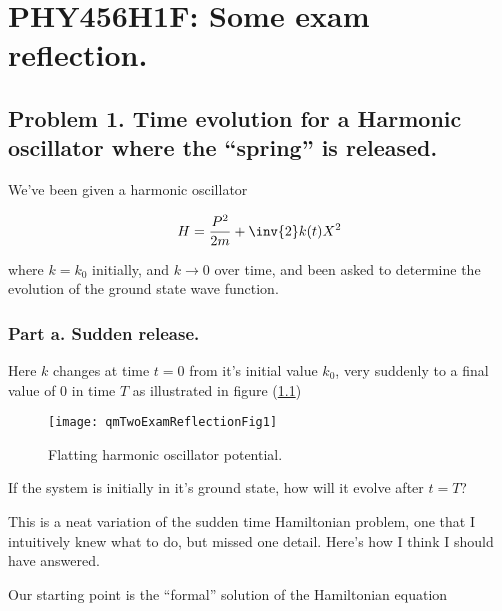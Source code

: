 
%

\chapter{PHY456H1F: Some exam reflection.}
\label{chap:qmTwoExamReflection}
{}
\date{Dec 13, 2011}

\beginArtWithToc

\section{Problem 1.  Time evolution for a Harmonic oscillator where the ``spring'' is released.}

We've been given a harmonic oscillator

\begin{equation}\label{eqn:qmTwoExamReflection:10}
H = \frac{P^2}{2m} + \inv{2} k(t) X^2
\end{equation}

where $k = k_0$ initially, and $k \rightarrow 0$ over time, and been asked to determine the evolution of the ground state wave function.

\subsection{Part a.  Sudden release.}

Here $k$ changes at time $t=0$ from it's initial value $k_0$, very suddenly to a final value of $0$ in time $T$ as illustrated in figure (\ref{fig:qmTwoExamReflection:qmTwoExamReflectionFig1})
\begin{figure}[htp]
   \centering
   \texttt{[image: qmTwoExamReflectionFig1]}
   \caption{Flatting harmonic oscillator potential.}\label{fig:qmTwoExamReflection:qmTwoExamReflectionFig1}
\end{figure}

If the system is initially in it's ground state, how will it evolve after $t = T$?

This is a neat variation of the sudden time Hamiltonian problem, one that I intuitively knew what to do, but missed one detail.  Here's how I think I should have answered.

Our starting point is the ``formal'' solution of the Hamiltonian equation

